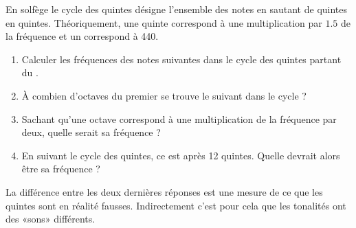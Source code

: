 
\begin{exercice}\label{exosmath-0311}

    En solfège le cycle des quintes désigne l'ensemble des notes en sautant de quintes en quintes. Théoriquement, une quinte correspond à une multiplication par \( 1.5\) de la fréquence et un  correspond à \unit{440}{\hertz}. 
    \begin{enumerate}
        \item
            Calculer les fréquences des notes suivantes dans le cycle des quintes partant du .
        \item
            À combien d'octaves du premier  se trouve le  suivant dans le cycle ? 
        \item
            Sachant qu'une octave correspond à une multiplication de la fréquence par deux, quelle serait sa fréquence ?
        \item
            En suivant le cycle des quintes, ce  est après 12 quintes. Quelle devrait alors être sa fréquence ?
    \end{enumerate}
    La différence entre les deux dernières réponses est une mesure de ce que les quintes sont en réalité fausses. Indirectement c'est pour cela que les tonalités ont des «sons» différents.
    
    
\end{exercice}
